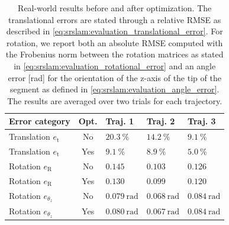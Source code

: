 \begin{table}
\centering
\caption{ Real-world results before and after optimization. The translational errors are stated through a relative \gls{RMSE} as described in \eqref{eq:srslam:evaluation_translational_error}. For rotation, we report both an absolute \gls{RMSE} computed with the Frobenius norm between the rotation matrices as stated in \eqref{eq:srslam:evaluation_rotational_error} and an angle error [rad] for the orientation of the z-axis of the tip of the segment as defined in \eqref{eq:srslam:evaluation_angle_error}. The results are averaged over two trials for each trajectory.}
\begin{tabular}{lclll}\toprule
\textbf{Error category} & \textbf{Opt.} & \textbf{Traj. 1} & \textbf{Traj. 2} & \textbf{Traj. 3}\\
\midrule
Translation $e_\mathrm{t}$ & No & $\SI{20.3}{\percent}$ & $\SI{14.2}{\percent}$ & $\SI{9.1}{\percent}$ \\
Translation $e_\mathrm{t}$ & Yes & $\SI{9.1}{\percent}$ & $\SI{8.9}{\percent}$ & $\SI{5.0}{\percent}$ \\
\midrule
Rotation $e_\mathrm{R}$ & No & $0.145$ & $0.103$ & $0.126$ \\
Rotation $e_\mathrm{R}$ & Yes & $0.130$ & $0.099$ & $0.120$ \\
\midrule
Rotation $e_{\theta_z}$ & No & $\SI{0.079}{\radian}$ & $\SI{0.068}{\radian}$ & $\SI{0.084}{\radian}$ \\
Rotation $e_{\theta_z}$ & Yes & $\SI{0.080}{\radian}$ & $\SI{0.067}{\radian}$ & $\SI{0.084}{\radian}$ \\
\bottomrule
\end{tabular}
\label{tab:srslam:results_lab_experiments}
\end{table}

